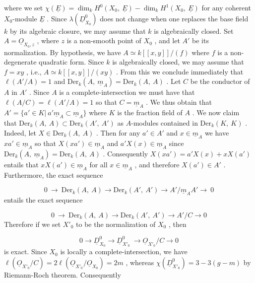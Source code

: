 where we set  $\chi(\underline{E}) = \dim_k H^0(X_0,\ \underline{E}) - \dim_k H^1(X_0,\ \underline{E})$  for any coherent  $X_0$-module  $\underline{E}$ . Since  $\lambda(\underline{D}^0_{X_0})$  does not change when one replaces the base field  $k$  by its algebraic closure, we may assume that  $k$  is algebraically closed. Set  $A = \underline{O}_{X_0,z}$ , where  $z$  is a non-smooth point of  $X_0$ , and let  $A'$  be its normalization. By hypothesis, we have  $A \simeq k[[x,y]]/(f)$  where  $f$  is a non-degenerate quadratic form. Since  $k$  is algebraically closed, we may assume that  $f = xy$ , i.e., $A \simeq k[[x,y]]/(xy)$ . From this we conclude immediately that  $\ell(A'/A) = 1$  and  $\mathrm{Der}_k(A,\ \underline{m}_A) = \mathrm{Der}_k(A,\ A)$ . Let  $C$  be the conductor of  $A$  in  $A'$ . Since $A$ is a complete-intersection we must have that  $\ell(A/C) = \ell(A'/A) = 1$  so that  $C = \underline{m}_A$ . We thus obtain that  $A' = \{a' \in K |\ a'\underline{m}_A \subset \underline{m}_A\}$  where  $K$  is the fraction field of  $A$ . We now claim that  $\mathrm{Der}_k(A,\ A) \subset \mathrm{Der}_k(A',\ A')$  as $A$-modules contained in  $\mathrm{Der}_k(K,\ K)$ . Indeed, let  $X \in \mathrm{Der}_k(A,\ A)$ . Then for any  $a' \in A'$  and
$x \in \underline{m}_A$  we have  $xa' \in \underline{m}_A$  so that  $X(xa') \in \underline{m}_A$  and  $a'X(x) \in \underline{m}_A$  since  $\mathrm{Der}_k(A,\ \underline{m}_A) = \mathrm{Der}_k(A,\ A)$ . Consequently  $X(xa') = a'X(x) + xX(a')$  entails that  $xX(a') \in \underline{m}_A$  for all  $x \in \underline{m}_A$ , and therefore  $X(a') \in A'$ . Furthermore, the exact sequence

\begin{equation*}
0 \ \rightarrow\ \mathrm{Der}_k(A,\ A) \rightarrow \mathrm{Der}_k(A',\ A') \rightarrow A'/\underline{m}_A A' \rightarrow\ 0
\end{equation*}
entails the exact sequence

\begin{equation*}
0 \ \rightarrow\ \mathrm{Der}_k(A,\ A) \rightarrow \mathrm{Der}_k(A',\ A') \rightarrow A'/C \rightarrow 0
\end{equation*}
Therefore if we set  $X'_0$  to be the normalization of  $X_0$ , then

\begin{equation*}
0 \rightarrow \underline{D}^0_{X_0} \rightarrow \underline{D}^0_{X'_0}\ \rightarrow \underline{O}_{X'_0}/C \rightarrow 0
\end{equation*}
is exact. Since  $X_0$  is locally a complete-intersection, we have  $\ell(\underline{O}_{X'_0}/C) = 2\ell(\underline{O}_{X'_0}/\underline{O}_{X_0}) = 2m$ , whereas  $\chi(\underline{D}^0_{X'_0}) = 3 - 3(g-m)$  by Riemann-Roch theorem. Consequently

